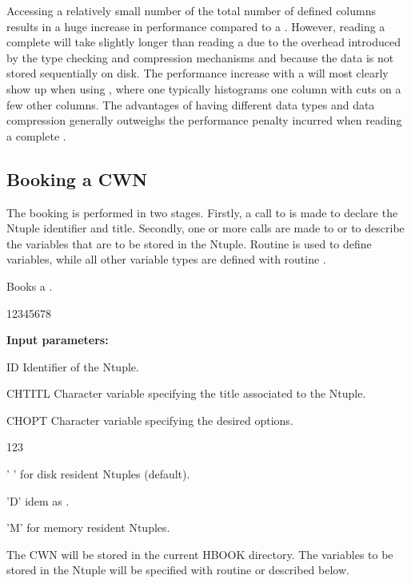 Accessing a relatively small number of the total number of
defined columns results in a huge increase in performance compared to
a \RWN{}.
However, reading a complete \CWN{} will take
slightly longer than reading a \RWN{} due to the overhead
introduced by the type checking and compression mechanisms and
because the data is not stored sequentially on disk.  
The performance increase with a \CWN{} will most clearly show up when 
using \PAW{}, where one typically histograms one
column with cuts on a few other columns.  
The advantages of having different data types and data compression generally
outweighs the performance penalty incurred when reading a complete \CWN{}.

\newpage%

\subsection{Booking a CWN}
\label{HNTUBOOKT}

The booking is performed in two stages. 
Firstly, a call to 
is made to declare the Ntuple identifier and title. 
Secondly, one or more
calls are made to  or  to describe 
the variables that are to be stored in the Ntuple. 
Routine  is used to define  variables,
while all other variable types are defined with routine .


\Action
Books a \CWN.
 
\begin{DLtt}{12345678}
\item[{\rm\bf Input parameters:}]
\item[ID]     Identifier of the Ntuple.
\item[CHTITL] Character variable specifying the title associated to the Ntuple.
\item[CHOPT]  Character variable specifying the desired options.
   \begin{DLtt}{123}
     \item[' '] for disk resident Ntuples (default).
     \item['D'] idem as .
     \item['M'] for memory resident Ntuples.
   \end{DLtt}
\end{DLtt}

The CWN{} will be stored in the current HBOOK directory.
The variables to be stored in the Ntuple will be specified
with routine  or  described below.

